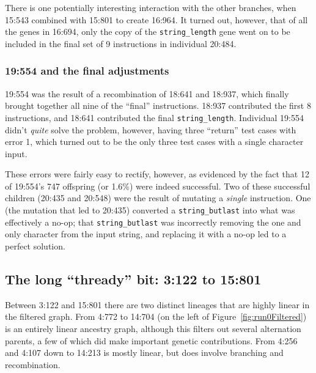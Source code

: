 There is one potentially interesting interaction with the other branches, 
when 15:543 combined with 15:801 to create 16:964. It turned out, however,
that of all the genes in 16:694, only the copy of the \texttt{string\_length} 
gene went on to be included in the final set of 9 instructions in individual 
20:484.

\subsubsection{19:554 and the final adjustments}


19:554 was the result of a recombination of 18:641 and 18:937, which finally
brought together all nine of the ``final'' instructions. 18:937 contributed
the first 8 instructions, and 18:641 contributed the final 
\texttt{string\_length}. Individual 19:554 didn't \emph{quite} solve the
problem, however, having three ``return'' test cases with error 1, which turned
out to be the only three test cases with a single character input.

These errors were fairly easy to rectify, however, as evidenced by the 
fact that 12 of 19:554's 747 offspring (or 1.6\%) were indeed successful.
Two of these successful children (20:435 and 20:548) were the result of 
mutating a \emph{single} instruction. One (the mutation that led to 20:435) 
converted a \texttt{string\_butlast} into what was effectively a no-op; that
\texttt{string\_butlast} was incorrectly removing the one and only character
from the input string, and replacing it with a no-op led to a perfect solution.

\subsection{The long ``thready'' bit: 3:122 to 15:801}


Between 3:122 and 15:801 there are two distinct lineages that are highly
linear in the filtered graph. From 4:772 to 14:704 (on the left of
Figure~\ref{fig:run0Filtered}) is an entirely linear ancestry graph, although
this filters out several alternation parents, a few of which did make
important genetic contributions. From 4:256 and 4:107 down to 14:213 is
mostly linear, but does involve branching and recombination.

